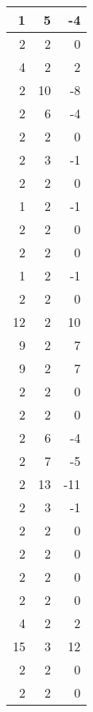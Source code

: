 \documentclass[11pt]{article}
\begin{document}
\begin{center}
\begin{tabular}{rrr}
       1  &          5  &        -4  \\ \hline
       2  &          2  &         0  \\ \hline
       4  &          2  &         2  \\ \hline
       2  &         10  &        -8  \\ \hline
       2  &          6  &        -4  \\ \hline
       2  &          2  &         0  \\ \hline
       2  &          3  &        -1  \\ \hline
       2  &          2  &         0  \\ \hline
       1  &          2  &        -1  \\ \hline
       2  &          2  &         0  \\ \hline
       2  &          2  &         0  \\ \hline
       1  &          2  &        -1  \\ \hline
       2  &          2  &         0  \\ \hline
      12  &          2  &        10  \\ \hline
       9  &          2  &         7  \\ \hline
       9  &          2  &         7  \\ \hline
       2  &          2  &         0  \\ \hline
       2  &          2  &         0  \\ \hline
       2  &          6  &        -4  \\ \hline
       2  &          7  &        -5  \\ \hline
       2  &         13  &       -11  \\ \hline
       2  &          3  &        -1  \\ \hline
       2  &          2  &         0  \\ \hline
       2  &          2  &         0  \\ \hline
       2  &          2  &         0  \\ \hline
       2  &          2  &         0  \\ \hline
       4  &          2  &         2  \\ \hline
      15  &          3  &        12  \\ \hline
       2  &          2  &         0  \\ \hline
       2  &          2  &         0  \\ \hline

\end{tabular}
\end{center}
\end{document}
